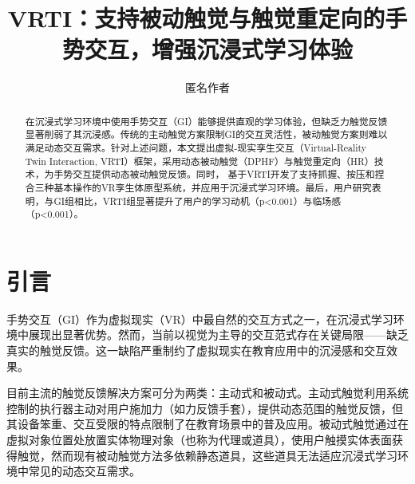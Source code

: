\documentclass[runningheads]{llncs}
\begin{document}
\title{VRTI：支持被动触觉与触觉重定向的手势交互，增强沉浸式学习体验}

 


\author{匿名作者}

\maketitle


\begin{abstract}
在沉浸式学习环境中使用手势交互（GI）能够提供直观的学习体验，但缺乏力触觉反馈显著削弱了其沉浸感。传统的主动触觉方案限制GI的交互灵活性，被动触觉方案则难以满足动态交互需求。针对上述问题，本文提出虚拟-现实孪生交互（Virtual-Reality Twin Interaction, VRTI）框架，采用动态被动触觉（DPHF）与触觉重定向（HR）技术，为手势交互提供动态被动触觉反馈。同时，
基于VRTI开发了支持抓握、按压和捏合三种基本操作的VR孪生体原型系统，并应用于沉浸式学习环境。最后，用户研究表明，与GI组相比，VRTI组显著提升了用户的学习动机（p<0.001）与临场感（p<0.001）。

\end{abstract}

\section{引言}
手势交互（GI）作为虚拟现实（VR）中最自然的交互方式之一，在沉浸式学习环境中展现出显著优势\cite{fang2024interactive,amaral2024interactive}。然而，当前以视觉为主导的交互范式存在关键局限——缺乏真实的触觉反馈。这一缺陷严重制约了虚拟现实在教育应用中的沉浸感和交互效果。

目前主流的触觉反馈解决方案可分为两类：主动式和被动式。主动式触觉利用系统控制的执行器主动对用户施加力（如力反馈手套），提供动态范围的触觉反馈，但其设备笨重、交互受限的特点限制了在教育场景中的普及应用\cite{bonfert2023challenges,shigeyama2019transcalibur}。被动式触觉通过在虚拟对象位置处放置实体物理对象（也称为代理或道具），使用户触摸实体表面获得触觉\cite{hinckley1994passive}，然而现有被动触觉方法多依赖静态道具\cite{strandholt2020knock,fang2023vr,rettinger2023touching}，这些道具无法适应沉浸式学习环境中常见的动态交互需求。
\end{document}
